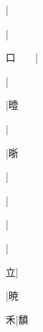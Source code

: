 \begin{multicols}{2}
{{}|{}\par
{\cjk{}{\cnsym{}　}{\cnsym{}　}{\cnsym{}　}}|{}\par
{\cjk{}口{\cnsym{}　}{\cnsym{}　}}|{}\par
{\cjk{}{\cnsym{}　}{\cnsym{}　}{\cnsym{}　}}|{}\par
{\cjk{}{\cnsym{}　}{\cnsym{}　}{\cnsym{}　}}|{\cjk{}曀}\par
{\cjk{}{\cnsym{}　}{\cnsym{}　}{\cnsym{}　}}|{}\par
{\cjk{}{\cnsym{}　}{\cnsym{}　}{\cnsym{}　}}|{\cjk{}晣}\par
{\cjk{}{\cnsym{}　}{\cnsym{}　}{\cnsym{}　}}|{}\par
{}|{}\par
{}|{}\par
{\cjk{}{\cnsym{}　}{\cnsym{}　}{\cnsym{}　}}|{}\par
{\cjk{}{\cnsym{}　}{\cnsym{}　}立}|{}\par
{\cjk{}{\cnsym{}　}{\cnsym{}　}{\cnsym{}　}}|{\cjk{}暁}\par
{\cjk{}{\cnsym{}　}{\cnsym{}　}禾}|{\cjk{}馩}\par
}
\end{multicols}

